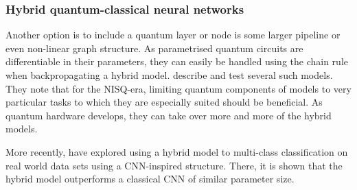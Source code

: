 \subsubsection{Hybrid quantum-classical neural networks}
Another option is to include a quantum layer or node is some larger pipeline or even non-linear graph structure.
As parametrised quantum circuits are differentiable in their parameters, they can easily be handled using the chain rule when backpropagating a hybrid model.
\textcite{killoran2019} describe and test several such models.
They note that for the NISQ-era, limiting quantum components of models to very particular tasks to which they are especially suited should be beneficial.
As quantum hardware develops, they can take over more and more of the hybrid models.

More recently, \textcite{zeng2022} have explored using a hybrid model to multi-class classification on real world data sets using a CNN-inspired structure.
There, it is shown that the hybrid model outperforms a classical CNN of similar parameter size.